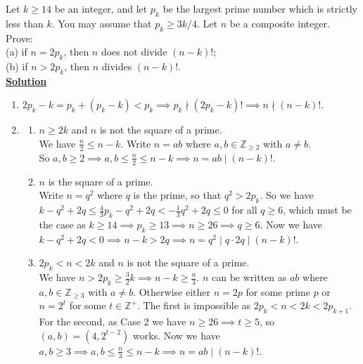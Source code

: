 \documentclass{article}
\begin{document}
Let $k\geq14$ be an integer, and let $p_k$ be the largest prime number which is strictly less than $k$. You may assume that $p_k\geq3k/4$. Let $n$ be a composite integer. Prove:\\
(a) if $n=2p_k$, then $n$ does not divide $(n-k)!$;\\
(b) if $n>2p_k$, then $n$ divides $(n-k)!$.\\

\underline{\textbf{Solution}}

\begin{enumerate}[label=(a), leftmargin=*]
\item
$2p_k-k=p_k+(p_k-k)<p_k \implies p_k \nmid (2p_k-k)! \implies n \nmid (n-k)!$.
\item[(b)]

\begin{enumerate}[label=\underline{Case 1:}, leftmargin=*]
\item
$n\geq2k$ and $n$ is not the square of a prime.\\
We have $\frac{n}{2}\leq n-k$. Write $n=ab$ where $a,b\in\mathbb{Z}_{\geq2}$ with $a\neq b$.\\
So $a,b\geq2\implies a,b\leq\frac{n}{2}\leq n-k\implies n=ab\mid (n-k)!$.

\item[\underline{Case 2:}]
$n$ is the square of a prime.\\
Write $n=q^2$ where $q$ is the prime, so that $q^2>2p_k$. So we have $k-q^2+2q\leq\frac{4}{3}p_k-q^2+2q<-\frac{1}{3}q^2+2q\leq0$ for all $q\geq6$, which must be the case as $k\geq14\implies p_k\geq13\implies n\geq26\implies q\geq6$. Now we have $k-q^2+2q<0\implies n-k>2q\implies n=q^2\mid q\cdot2q\mid(n-k)!$.

\item[\underline{Case 3:}]
$2p_k<n<2k$ and $n$ is not the square of a prime.\\
We have $n>2p_k\geq\frac{3}{2}k\implies n-k\geq\frac{n}{3}$. $n$ can be written as $ab$ where $a,b\in\mathbb{Z}_{\geq3}$ with $a\neq b$. Otherwise either $n=2p$ for some prime $p$ or $n=2^t$ for some $t\in\mathbb{Z}^+$. The first is impossible as $2p_k<n<2k<2p_{k+1}$. For the second, as Case 2 we have $n\geq26\implies t\geq5$, so $(a,b)=(4,2^{t-2})$ works. Now we have $a,b\geq3\implies a,b\leq\frac{n}{3}\leq n-k\implies n=ab\mid(n-k)!$.

\end{enumerate}
\end{enumerate}
\end{document}
